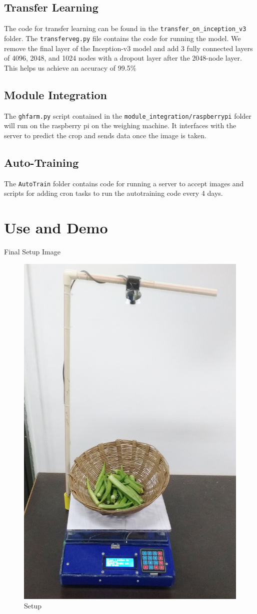 \documentclass[a4paper,12pt,oneside]{book}
\begin{document}
\subsection{Transfer Learning}
The code for transfer learning can be found in the \texttt{transfer\_on\_inception\_v3} folder. The \texttt{transferveg.py} file contains the code for running the model.
We remove the final layer of the Inception-v3 model and add 3 fully connected layers of 4096, 2048, and 1024 nodes with a dropout layer after the 2048-node layer.
This helps us achieve an accuracy of 99.5\%

\subsection{Module Integration}
The \texttt{ghfarm.py} script contained in the \texttt{module\_integration/raspberrypi} folder will run on the raspberry pi on the weighing machine. It interfaces with the server to predict the crop and sends data once the image is taken.

\subsection{Auto-Training}
The \texttt{AutoTrain} folder contains code for running a server to accept images and scripts for adding cron tasks to run the autotraining code every 4 days.

\newpage
\section{Use and Demo}
Final Setup Image
\begin{figure}[!ht]
	\centering
	\includegraphics[width=0.5\linewidth]{setup.jpg}
	\caption{Setup}
	\label{fig:setup}
\end{figure}
\end{document}
